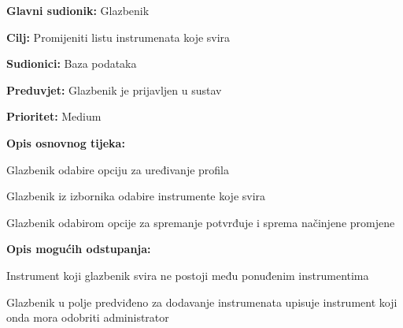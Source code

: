 \noindent {}
	\begin{packed_item}
		
		\item \textbf{Glavni sudionik:} Glazbenik
		\item \textbf{Cilj:} Promijeniti listu instrumenata koje svira
		\item \textbf{Sudionici:} Baza podataka
		\item \textbf{Preduvjet:} Glazbenik je prijavljen u sustav
		\item \textbf{Prioritet:} Medium
		\item \textbf{Opis osnovnog tijeka:}
		
		\item[] \begin{packed_enum}
			\item Glazbenik odabire opciju za uređivanje profila
			\item Glazbenik iz izbornika odabire instrumente koje svira
			\item Glazbenik odabirom opcije za spremanje potvrđuje i sprema načinjene promjene
		\end{packed_enum}
		
		\item  \textbf{Opis mogućih odstupanja:}
		
		\item[] \begin{packed_item}
			
			\item[2.a] Instrument koji glazbenik svira ne postoji među ponuđenim instrumentima
			\item[] \begin{packed_enum}
				
				\item Glazbenik u polje predviđeno za dodavanje instrumenata upisuje instrument koji onda mora odobriti administrator
				
			\end{packed_enum}	
		\end{packed_item}
	\end{packed_item}

